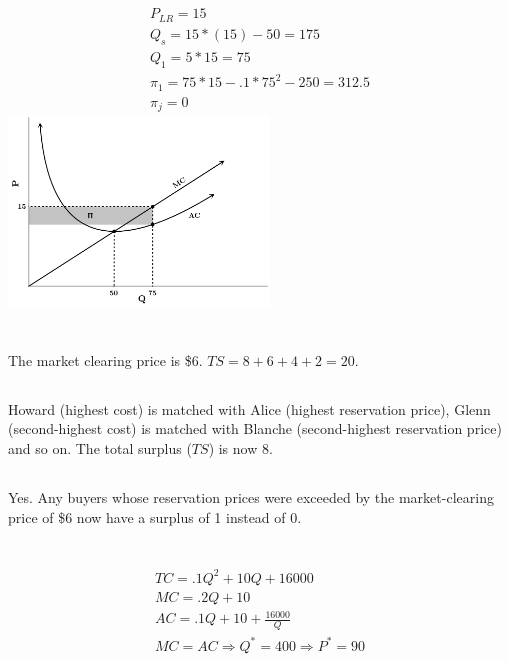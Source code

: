 \documentclass{article}
\begin{document}
	\subsection[c]{}
		\begin{align*}
			P_{LR}=15\\
			Q_s=15*(15)-50=175\\
			Q_1=5*15=75\\
			\pi_1=75*15-.1*75^2-250=312.5\\
			\pi_j=0
		\end{align*}
		\includegraphics[height=2in]{Charts/1c}	
\section[2]{}
	\subsection[a]{}
		The market clearing price is \$6. $TS = 8+6+4+2=20$. 
	\subsection[b]{}
		Howard (highest cost) is matched with Alice (highest reservation price), Glenn (second-highest cost) is matched with Blanche (second-highest reservation price) and so on. The total surplus ($TS$) is now 8. 
	\subsection[c]{}
		Yes. Any buyers whose reservation prices were exceeded by the market-clearing price of \$6 now have a surplus of 1 instead of 0. 	
\section[3]{}
	\subsection[a]{}
		\begin{align*}
			TC=.1Q^2+10Q+16000\\
			MC=.2Q+10\\
			AC=.1Q+10+\frac{16000}{Q}\\
			MC = AC \Rightarrow Q^*=400 \Rightarrow P^* = 90 \\
		\end{align*}
\end{document}

